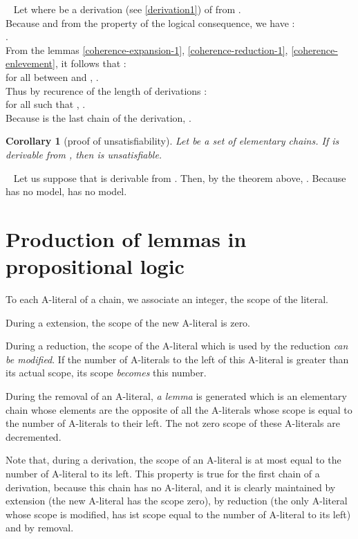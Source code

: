 \documentclass{article}
\newtheorem{corollaire}[theoreme]{Corollary}
\newenvironment{preuve}{\noindent {\em Proof :}\ }{{\hfill
    }\vspace{.5pc}} \newcommand{\sg}{\!\!<\!\!}
\begin{document}
\begin{preuve}
Let  where  be a derivation (see \ref{derivation1}) of  from .\\
Because  and from the property of the logical consequence, we have :\\ .\\
From the lemmas \ref{coherence-expansion-1}, \ref{coherence-reduction-1}, \ref{coherence-enlevement}, it follows that :\\
for all  between  and , .\\
Thus by recurence of the length of derivations :\\
for all  such that , .\\
Because  is the last chain of the derivation, .
\end{preuve}

\begin{corollaire}[proof of unsatisfiability]\label{coherence-ME-1}
Let  be a set of elementary chains. If  is derivable from , then  is unsatisfiable.
\end{corollaire}

\begin{preuve}
Let us suppose that  is derivable from . Then, by the theorem above, 
 .
Because  has no model,   has no model.
\end{preuve}

\section{Production of lemmas in propositional logic}

To each A-literal of a chain, we associate an integer, the scope of the literal.

During a extension, the scope of the new A-literal is zero.

During a reduction, the scope of the A-literal which is used by the reduction \emph{can be modified}. If the number of
A-literals to the left of this A-literal is greater than its actual scope, its scope \emph{becomes} this number.

During the removal of an A-literal, \emph{a lemma} is generated which is an elementary chain whose elements are the opposite of
all the A-literals whose scope is equal to the number of A-literals to their left. The not zero scope of these A-literals are 
decremented.


Note that, during a derivation, the scope of an A-literal is at most equal to the number of A-literal to its left.
This property is true for the first chain of a derivation, because this chain has no A-literal, and it is clearly maintained
by extension (the new A-literal has the scope zero), by reduction (the only A-literal whose scope is modified, has ist scope
equal to the number of A-literal to its left) and by removal. 
\end{document}
